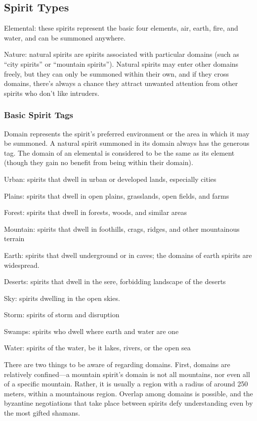 \subsection{Spirit Types}
Elemental: these spirits represent the basic four elements, air, earth, fire, and water, and can be summoned anywhere.

Nature: natural spirits are spirits associated with particular domains (such as “city spirits” or “mountain spirits”). Natural spirits may enter other domains freely, but they can only be summoned within their own, and if they cross domains, there’s always a chance they attract unwanted attention from other spirits who don’t like intruders.

\subsubsection{Basic Spirit Tags}
Domain represents the spirit’s preferred environment or the area in which it may be summoned. A natural spirit summoned in its domain always has the generous tag. The domain of an elemental is considered to be the same as its element (though they gain no benefit from being within their domain).

Urban: spirits that dwell in urban or developed lands, especially cities

Plains: spirits that dwell in open plains, grasslands, open fields, and farms

Forest: spirits that dwell in forests, woods, and similar areas

Mountain: spirits that dwell in foothills, crags, ridges, and other mountainous terrain

Earth: spirits that dwell underground or in caves; the domains of earth spirits are widespread.

Deserts: spirits that dwell in the sere, forbidding landscape of the deserts

Sky: spirits dwelling in the open skies.

Storm: spirits of storm and disruption

Swamps: spirits who dwell where earth and water are one

Water: spirits of the water, be it lakes, rivers, or the open sea

There are two things to be aware of regarding domains. First, domains are relatively confined—a mountain spirit’s domain is not all mountains, nor even all of a specific mountain. Rather, it is usually a region with a radius of around 250 meters, within a mountainous region. Overlap among domains is possible, and the byzantine negotiations that take place between spirits defy understanding even by the most gifted shamans.

